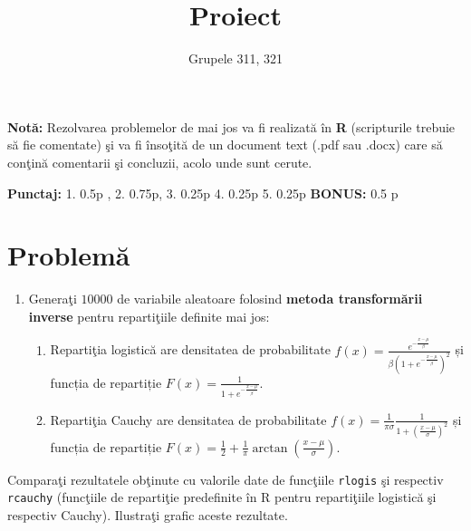 \documentclass[]{article}
\title{Proiect}
\subtitle{Grupele 311, 321}
\author{}
\date{}
\begin{document}
\maketitle

\thispagestyle{fancy}

\textbf{Notă:} Rezolvarea problemelor de mai jos va fi realizată în
\textbf{R} (scripturile trebuie să fie comentate) şi va fi însoţită de
un document text (.pdf sau .docx) care să conţină comentarii şi
concluzii, acolo unde sunt cerute.

\textbf{Punctaj:} 1. 0.5p , 2. 0.75p, 3. 0.25p 4. 0.25p 5. 0.25p
\textbf{BONUS:} 0.5 p

\section{Problemă}\label{problema}

\begin{enumerate}
\def\labelenumi{\arabic{enumi}.}
\item
  Generaţi \(10 000\) de variabile aleatoare folosind \textbf{metoda
  transformării inverse} pentru repartiţiile definite mai jos:

  \begin{enumerate}
  \def\labelenumii{\alph{enumii})}
  \item
    Repartiţia logistică are densitatea de probabilitate
    \(f(x) = \frac{e^{-\frac{x-\mu}{\beta}}}{\beta\left(1+e^{-\frac{x-\mu}{\beta}}\right)^2}\)
    și funcția de repartiție
    \(F(x) = \frac{1}{1+e^{-\frac{x-\mu}{\beta}}}\).
  \item
    Repartiţia Cauchy are densitatea de probabilitate
    \(f(x) = \frac{1}{\pi \sigma}\frac{1}{1+\left(\frac{x-\mu}{\sigma}\right)^2}\)
    și funcția de repartiție
    \(F(x) = \frac{1}{2}+\frac{1}{\pi}\arctan\left(\frac{x-\mu}{\sigma}\right)\).
  \end{enumerate}
\end{enumerate}

Comparaţi rezultatele obţinute cu valorile date de funcţiile
\texttt{rlogis} şi respectiv \texttt{rcauchy} (funcţiile de repartiţie
predefinite în R pentru repartiţiile logistică şi respectiv Cauchy).
Ilustraţi grafic aceste rezultate.
\end{document}

